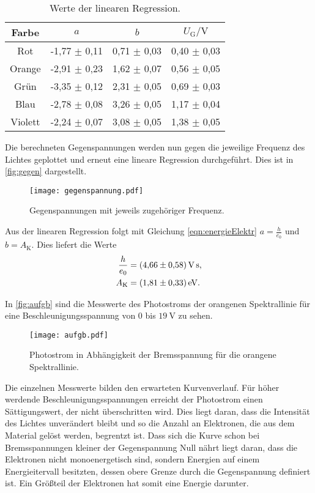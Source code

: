 \begin{table}[H]
  \centering
  \begin{tabular}{c c c c}
      \toprule
      Farbe & $a$ & $b$ & $U_\text{G} / \si{\volt}$\\
      \midrule
      Rot &  -1,77 $\pm$ 0,11 & 0,71 $\pm$ 0,03 & 0,40 $\pm$ 0,03 \\
      Orange &  -2,91 $\pm$ 0,23 & 1,62 $\pm$ 0,07 & 0,56 $\pm$ 0,05 \\
      Grün & -3,35 $\pm$ 0,12 & 2,31 $\pm$ 0,05 & 0,69 $\pm$ 0,03 \\
      Blau &  -2,78 $\pm$ 0,08 & 3,26 $\pm$ 0,05 & 1,17 $\pm$ 0,04 \\
      Violett &  -2,24 $\pm$ 0,07 & 3,08 $\pm$ 0,05 & 1,38 $\pm$ 0,05 \\
      \bottomrule
  \end{tabular}
  \caption{Werte der linearen Regression.}
  \label{tab:ug}
\end{table}

\noindent
Die berechneten Gegenspannungen werden nun gegen die jeweilige Frequenz des Lichtes geplottet und erneut eine lineare Regression durchgeführt. Dies ist in \autoref{fig:gegen} dargestellt.

\begin{figure}[H]
  \centering
  \texttt{[image: gegenspannung.pdf]}
  \caption{Gegenspannungen mit jeweils zugehöriger Frequenz.}
  \label{fig:gegen}
\end{figure}

\noindent
Aus der linearen Regression folgt mit Gleichung \eqref{eqn:energieElektr} $a=\frac{h}{e_0}$ und $b=A_\text{K}$. Dies liefert die Werte
\begin{align*}
  \frac{h}{e_0} &= \SI{4,66 \pm 0,58}{\volt\second}, \\
  A_\text{K} &= \SI{1,81 \pm 0,33}{\electronvolt}.
\end{align*}

\newpage
\noindent
In \autoref{fig:aufgb} sind die Messwerte des Photostroms der orangenen Spektrallinie für eine Beschleunigungsspannung von $0$ bis $\SI{19}{\volt}$ zu sehen.
\begin{figure}[H]
  \centering
  \texttt{[image: aufgb.pdf]}
  \caption{Photostrom in Abhängigkeit der Bremsspannung für die orangene Spektrallinie.}
  \label{fig:aufgb}
\end{figure}
\noindent
Die einzelnen Messwerte bilden den erwarteten Kurvenverlauf. Für höher werdende Beschleunigungsspannungen erreicht der Photostrom einen Sättigungswert, der nicht überschritten wird.
Dies liegt daran, dass die Intensität des Lichtes unverändert bleibt und so die Anzahl an Elektronen, die aus dem Material gelöst werden, begrentzt ist.
\newline
Dass sich die Kurve schon bei Bremsspannungen kleiner der Gegenspannung Null nährt liegt daran, dass die Elektronen nicht monoenergetisch sind, sondern Energien auf einem
Energieitervall besitzten, dessen obere Grenze durch die Gegenspannung definiert ist. Ein Größteil der Elektronen hat somit eine Energie darunter.
